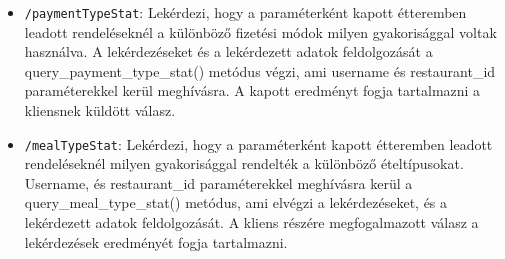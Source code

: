 \begin{itemize}
\item \texttt{/paymentTypeStat}:
Lekérdezi, hogy a paraméterként kapott étteremben leadott rendeléseknél a különböző fizetési módok milyen gyakorisággal voltak használva. A lekérdezéseket és a lekérdezett adatok feldolgozását a query\_payment\_type\_stat() metódus végzi, ami username és restaurant\_id paraméterekkel kerül meghívásra. A kapott eredményt fogja tartalmazni a kliensnek küldött válasz.
\item \texttt{/mealTypeStat}:
Lekérdezi, hogy a paraméterként kapott étteremben leadott rendeléseknél milyen gyakorisággal rendelték a különböző ételtípusokat. Username, és restaurant\_id paraméterekkel meghívásra kerül a query\_meal\_type\_stat() metódus, ami elvégzi a lekérdezéseket, és a lekérdezett adatok feldolgozását. A kliens részére megfogalmazott válasz a lekérdezések eredményét fogja tartalmazni.
\end{itemize}
